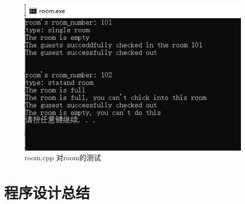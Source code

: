\documentclass[UTF8]{ctexart}
\begin{document}
  \begin{figure}[H]
    \includegraphics[scale=0.6]{test_room}
    \caption{room.cpp 对room的测试}
    \label{fig:test_room}
  \end{figure}
\section{程序设计总结}

\nocite{Lippman:2012:CP:2423877}%
\end{document}
